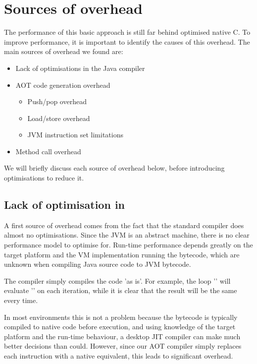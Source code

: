\section{Sources of overhead}
The performance of this basic approach is still far behind optimised native C. To improve performance, it is important to identify the causes of this overhead. The main sources of overhead we found are:
\begin{itemize}
	\item Lack of optimisations in the Java compiler
	\item AOT code generation overhead
	\begin{itemize}
		\item Push/pop overhead
		\item Load/store overhead
		\item JVM instruction set limitations
	\end{itemize}
	\item Method call overhead
\end{itemize}

We will briefly discuss each source of overhead below, before introducing optimisations to reduce it.

\subsection{Lack of optimisation in }
A first source of overhead comes from the fact that the standard  compiler does almost no optimisations.  Since the JVM is an abstract machine, there is no clear performance model to optimise for. Run-time performance depends greatly on the target platform and the VM implementation running the bytecode, which are unknown when compiling Java source code to JVM bytecode.

The  compiler simply compiles the code 'as is'. For example, the loop '' will evaluate '' on each iteration, while it is clear that the result will be the same every time.

In most environments this is not a problem because the bytecode is typically compiled to native code before execution, and using knowledge of the target platform and the run-time behaviour, a desktop JIT compiler can make much better decisions than  could. However, since our AOT compiler simply replaces each instruction with a native equivalent, this leads to significant overhead.

